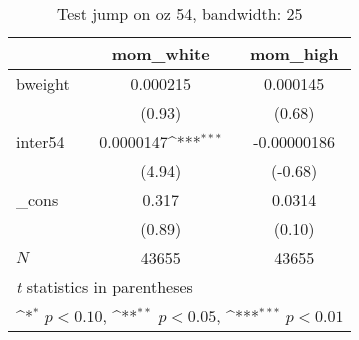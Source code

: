 \begin{table}[htbp]\centering
\def\sym#1{\ifmmode^{#1}\else\(^{#1}\)\fi}
\caption{Test jump on oz 54, bandwidth: 25}
\begin{tabular}{l*{2}{c}}
\hline\hline
            &\multicolumn{1}{c}{mom\_white}&\multicolumn{1}{c}{mom\_high}\\
\hline
bweight     &    0.000215         &    0.000145         \\
            &      (0.93)         &      (0.68)         \\
[1em]
inter54     &   0.0000147\sym{***}& -0.00000186         \\
            &      (4.94)         &     (-0.68)         \\
[1em]
\_cons      &       0.317         &      0.0314         \\
            &      (0.89)         &      (0.10)         \\
\hline
\(N\)       &       43655         &       43655         \\
\hline\hline
\multicolumn{3}{l}{\footnotesize \textit{t} statistics in parentheses}\\
\multicolumn{3}{l}{\footnotesize \sym{*} \(p<0.10\), \sym{**} \(p<0.05\), \sym{***} \(p<0.01\)}\\
\end{tabular}
\end{table}
